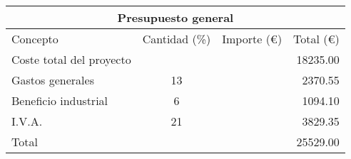 \begin{table}[!htb]
\centering
\begin{tabular}{lcrr}
\toprule
\multicolumn{4}{c}{Presupuesto general}\\
\midrule
Concepto & Cantidad (\%) & Importe (\euro) & Total (\euro)\\
\midrule
Coste total del proyecto & & & 18235.00\\
Gastos generales & 13 & & 2370.55\\
Beneficio industrial & 6 & & 1094.10\\
I.V.A. & 21 & & 3829.35\\
\bottomrule
Total & & & 25529.00\\
\bottomrule
\end{tabular}
\label{presupuestogeneral}
\end{table}
